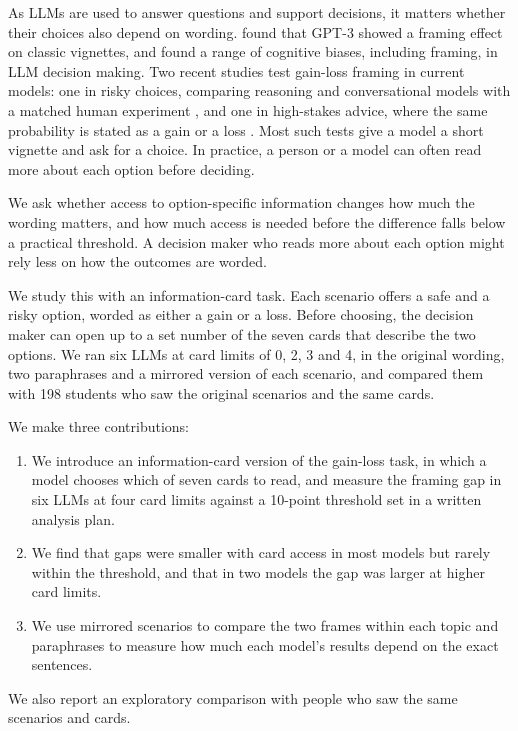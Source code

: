 \documentclass[11pt]{article}
\begin{document}
As LLMs are used to answer questions and support decisions, it matters whether their choices also depend on wording. \citet{binz2023using} found that GPT-3 showed a framing effect on classic vignettes, and \citet{echterhoff2024cognitive} found a range of cognitive biases, including framing, in LLM decision making. Two recent studies test gain-loss framing in current models: one in risky choices, comparing reasoning and conversational models with a matched human experiment \citep{ge2026mind}, and one in high-stakes advice, where the same probability is stated as a gain or a loss \citep{zhang2026same}. Most such tests give a model a short vignette and ask for a choice. In practice, a person or a model can often read more about each option before deciding.

We ask whether access to option-specific information changes how much the wording matters, and how much access is needed before the difference falls below a practical threshold. A decision maker who reads more about each option might rely less on how the outcomes are worded.

We study this with an information-card task. Each scenario offers a safe and a risky option, worded as either a gain or a loss. Before choosing, the decision maker can open up to a set number of the seven cards that describe the two options. We ran six LLMs at card limits of 0, 2, 3 and 4, in the original wording, two paraphrases and a mirrored version of each scenario, and compared them with 198 students who saw the original scenarios and the same cards.

We make three contributions:

\begin{enumerate}
  \item We introduce an information-card version of the gain-loss task, in which a model chooses which of seven cards to read, and measure the framing gap in six LLMs at four card limits against a 10-point threshold set in a written analysis plan.
  \item We find that gaps were smaller with card access in most models but rarely within the threshold, and that in two models the gap was larger at higher card limits.
  \item We use mirrored scenarios to compare the two frames within each topic and paraphrases to measure how much each model's results depend on the exact sentences.
\end{enumerate}

We also report an exploratory comparison with people who saw the same scenarios and cards.
\end{document}
